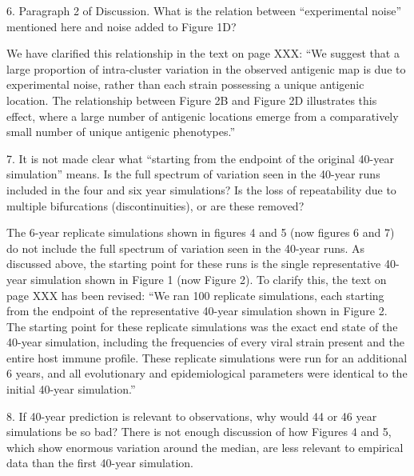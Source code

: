 \documentclass[11pt,oneside,letterpaper]{article}
\def\comment#1{
#1
}
\def\response#1{
\begin{bf}
#1
\end{bf}
}
\def\break{\vspace{0.2cm}}
\begin{document}
\break

\comment{6. Paragraph 2 of Discussion. What is the relation between ``experimental noise'' mentioned here and noise added to Figure 1D?}

\response{We have clarified this relationship in the text on page XXX: ``We suggest that a large proportion of intra-cluster variation in the observed antigenic map is due to experimental noise, rather than each strain possessing a unique antigenic location.  The relationship between Figure 2B and Figure 2D illustrates this effect, where a large number of antigenic locations emerge from a comparatively small number of unique antigenic phenotypes.''}

\break

\comment{7. It is not made clear what ``starting from the endpoint of the original 40-year simulation'' means. Is the full spectrum of variation seen in the 40-year runs included in the four and six year simulations? Is the loss of repeatability due to multiple bifurcations (discontinuities), or are these removed?}

\response{The 6-year replicate simulations shown in figures 4 and 5 (now figures 6 and 7) do not include the full spectrum of variation seen in the 40-year runs.  As discussed above, the starting point for these runs is the single representative 40-year simulation shown in Figure 1 (now Figure 2).  To clarify this, the text on page XXX has been revised: ``We ran 100 replicate simulations, each starting from the endpoint of the representative 40-year simulation shown in Figure 2.  The starting point for these replicate simulations was the exact end state of the 40-year simulation, including the frequencies of every viral strain present and the entire host immune profile.  These replicate simulations were run for an additional 6 years, and all evolutionary and epidemiological parameters were identical to the initial 40-year simulation.''}

\break

\comment{8. If 40-year prediction is relevant to observations, why would 44 or 46 year simulations be so bad? There is not enough discussion of how Figures 4 and 5, which show enormous variation around the median, are less relevant to empirical data than the first 40-year simulation.}
\end{document}
